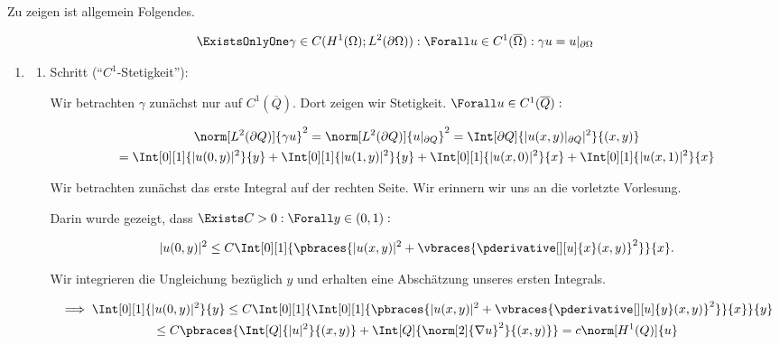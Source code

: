 \begin{solution}

Zu zeigen ist allgemein Folgendes.

\begin{align*}
  \ExistsOnlyOne \gamma \in C
  (
    H^1(\Omega);
    L^2(\partial \Omega)
  ):
  \Forall u \in C^1(\overline{\Omega}):
  \gamma u = u|_{\partial \Omega}
\end{align*}

\begin{enumerate}[label = \textbf{\alph*)}]

  \item

  \begin{enumerate}[label = \arabic*.]

    \item Schritt (\enquote{$C^1$-Stetigkeit}):

    Wir betrachten $\gamma$ zunächst nur auf $C^1(\overline{Q})$.
    Dort zeigen wir Stetigkeit.
    $\Forall u \in C^1(\overline{Q}):$

    \begin{multline*}
      \norm[L^2(\partial Q)]{\gamma u}^2
      =
      \norm[L^2(\partial Q)]{u|_{\partial Q}}^2
      =
      \Int[\partial Q]{|u(x, y)|_{\partial Q}|^2}{(x, y)} \\
      =
      \Int[0][1]{|u(0, y)|^2}{y}
      +
      \Int[0][1]{|u(1, y)|^2}{y}
      +
      \Int[0][1]{|u(x, 0)|^2}{x}
      +
      \Int[0][1]{|u(x, 1)|^2}{x}
    \end{multline*}

    Wir betrachten zunächst das erste Integral auf der rechten Seite.
    Wir erinnern wir uns an die vorletzte Vorlesung.


    Darin wurde gezeigt, dass $\Exists C > 0: \Forall y \in (0, 1):$

    \begin{align*}
      |u(0, y)|^2
      \leq
      C\Int[0][1]
      {
        \pbraces
        {
          |u(x, y)|^2
          +
          \vbraces
          {
            \pderivative[][u]{x}(x, y)
          }^2
        }
      }{x}.
    \end{align*}

    Wir integrieren die Ungleichung bezüglich $y$ und erhalten eine Abschätzung unseres ersten Integrals.

    \begin{multline*}
      \implies
      \Int[0][1]{|u(0, y)|^2}{y}
      \leq
      C
      \Int[0][1]
      {
        \Int[0][1]
        {
          \pbraces
          {
            |u(x, y)|^2
            +
            \vbraces
            {
              \pderivative[][u]{y}(x, y)
            }^2
          }
        }{x}
      }{y} \\
      \leq
      C
      \pbraces
      {
        \Int[Q]{|u|^2}{(x, y)}
        +
        \Int[Q]{\norm[2]{\nabla u}^2}{(x, y)}
      }
      =
      c \norm[H^1(Q)]{u}
    \end{multline*}


\end{enumerate}
\end{enumerate}
\end{solution}
